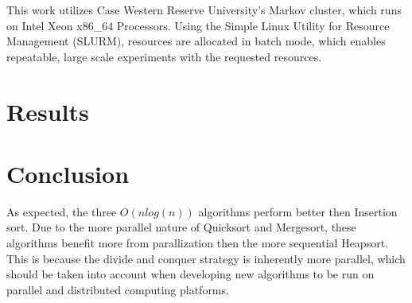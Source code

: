 \documentclass[conference]{IEEEtran}
\begin{document}
This work utilizes Case Western Reserve University's Markov cluster, which runs on Intel Xeon x86\_64 Processors. 
Using the Simple Linux Utility for Resource Management \cite{yoo_slurm_2003} (SLURM), resources are allocated in batch mode, which enables repeatable, large scale experiments with the requested resources. 

\section{Results}
\section{Conclusion}
As expected, the three $O(n log(n))$ algorithms perform better then Insertion sort. 
Due to the more parallel nature of Quicksort and Mergesort, these algorithms benefit more from parallization then the more sequential Heapsort. 
This is because the divide and conquer strategy is inherently more parallel, which should be taken into account when developing new algorithms to be run on parallel and distributed computing platforms. 


\appendix
\end{document}

